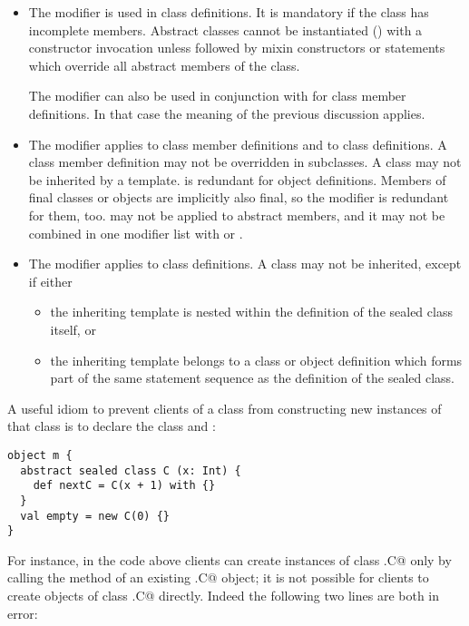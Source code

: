 \documentclass[a4paper,12pt,twoside,titlepage]{book}
\begin{document}
\begin{itemize}
\item
The  modifier is used in class definitions. It is
mandatory if the class has incomplete members.  Abstract classes
cannot be instantiated () with a constructor
invocation unless followed by mixin constructors or statements which
override all abstract members of the class.

The  modifier can also be used in conjunction with
 for class member definitions. In that case the meaning
of the previous discussion applies.
\item
The  modifier applies to class member definitions and to
class definitions. A  class member definition may not be
overridden in subclasses. A  class may not be inherited by
a template.  is redundant for object definitions.  Members
of final classes or objects are implicitly also final, so the
 modifier is redundant for them, too.   may
not be applied to abstract members, and it may not be combined in one
modifier list with  or .
\item
The  modifier applies to class definitions. A
 class may not be inherited, except if either
\begin{itemize}
\item
the inheriting template is nested within the definition of the sealed
class itself, or
\item
the inheriting template belongs to a class or object definition which
forms part of the same statement sequence as the definition of the
sealed class.
\end{itemize}
\end{itemize}

\example A useful idiom to prevent clients of a class from
constructing new instances of that class is to declare the class
 and :

\begin{lstlisting}
object m {
  abstract sealed class C (x: Int) {
    def nextC = C(x + 1) with {}
  }
  val empty = new C(0) {}
}
\end{lstlisting}
For instance, in the code above clients can create instances of class
\lstinline@m.C@ only by calling the  method of an existing \lstinline@m.C@
object; it is not possible for clients to create objects of class
\lstinline@m.C@ directly. Indeed the following two lines are both in error:
\end{document}
